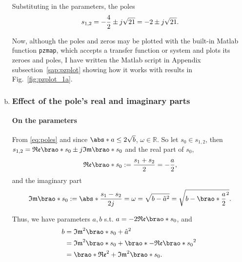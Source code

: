 \documentclass[12pt]{article}
\DeclarePairedDelimiter\brao()%
\DeclarePairedDelimiter\abs||
\begin{document}
\begin{enumerate}[(a)]
        Substituting in the parameters, the poles
        \begin{equation}
            s_{1,2} = -\frac42 \pm j\sqrt{21} = -2 \pm j\sqrt{21}\rlap.
        \end{equation}

        Now, although the poles and zeros may be plotted with the built-in Matlab function \texttt{pzmap}, which accepts a transfer function or system and plots its zeroes and poles,
        I have written the Matlab script in Appendix subsection~\ref{sap:pzplot} showing how it works with results in Fig.~\ref{fig:pzplot_1a}.

    \item
        \subsubsection{Effect of the pole's real and imaginary parts}
        \paragraph{On the parameters}
        From \eqref{eq:poles} and since $\abs*{a} \leq 2\sqrt{b}$, $\omega\in\mathbb{R}$. So let $s_0\in s_{1,2}$, then $s_{1,2} = \mathfrak{Re}\brao*{s_0} \pm j\mathfrak{Im}\brao*{s_0}$ and
        the real part of $s_0$,
        \begin{equation}\label{eq:Re(s0)}
            \mathfrak{Re}\brao*{s_0} := \frac{s_1 + s_2}2
            = -\frac{a}2\rlap,
        \end{equation}
        and the imaginary part
        \begin{equation}\label{eq:Im(s0)}
            \mathfrak{Im}\brao*{s_0} := \abs*{\frac{s_1 - s_2}{2j}} = \omega = \sqrt{b - \hat{a}^2} = \sqrt{b - \brao*{\frac{a}2}^2}\rlap.
        \end{equation}

        Thus, we have parameters $a,b$ s.t. $a = -2 \mathfrak{Re}\brao*{s_0}$, and
        \begin{equation}
            \begin{aligned}
                b &{}= \mathfrak{Im}^2\brao*{s_0} + \hat{a}^2
            \\*
                & {}= \mathfrak{Im}^2\brao*{s_0} + \brao*{-\mathfrak{Re}\brao*{s_0}}^2
            \\*
                & {}= \brao*{\mathfrak{Re}^2 + \mathfrak{Im}^2}\brao*{s_0}.
            \\*
            \end{aligned}
        \end{equation}


\end{enumerate}
\end{document}
